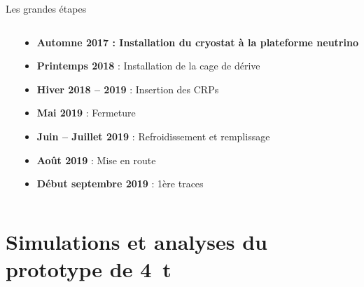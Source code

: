 \begin{frame}{Les grandes étapes}
\begin{columns}
\begin{column}{0.4\textwidth}
            \end{column}\hfill
            \begin{column}{0.55\textwidth}
                \begin{itemize}
                    \item \textbf{Automne 2017 : Installation du cryostat à la plateforme neutrino}
                    \item\textbf{Printemps 2018} : Installation de la cage de dérive
                    \item \textbf{Hiver 2018 -- 2019} : Insertion des CRPs
                    \item \textbf{Mai 2019} : Fermeture
                    \item \textbf{Juin -- Juillet 2019} : Refroidissement et remplissage 
                    \item \textbf{Août 2019} : Mise en route
                    \item \textbf{Début septembre 2019} : 1ère traces
                \end{itemize}
            \end{column}
        \end{columns}
    \end{frame}
    
    {
       	\setlength\pdfpagewidth{12.8cm}%
       	\setlength\pdfpageheight{6.75cm}%
       \begin{frame}[plain]
             	
       \end{frame}
     }

    \section[Analyse du \SI{4}{\tonne}]{Simulations et analyses du prototype de \SI{4}{\tonne}}
    
